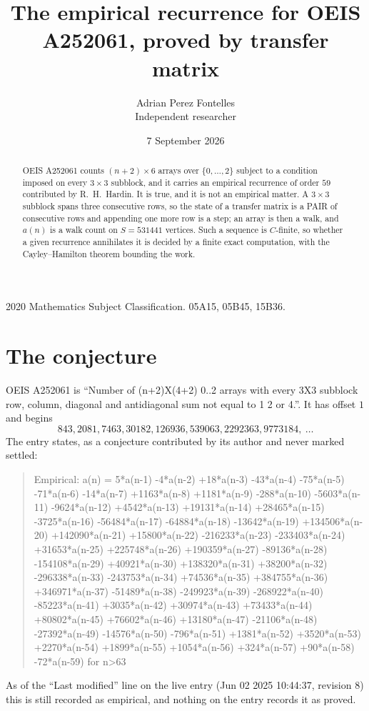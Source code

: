 \documentclass[11pt,a4paper]{article}
\title{The empirical recurrence for OEIS A252061, proved by transfer matrix}
\author{Adrian Perez Fontelles\\ \small Independent researcher}
\date{7 September 2026}
\theoremstyle{plain}
\theoremstyle{definition}
\begin{document}
\maketitle

\begin{abstract}
OEIS A252061 counts $(n+2)\times6$ arrays over $\{0,\dots,2\}$ subject to a condition imposed on
every $3\times3$ subblock, and it carries an empirical recurrence of order $59$
contributed by R.~H.~Hardin. It is true, and it is not an empirical matter. A $3\times3$
subblock spans three consecutive rows, so the state of a transfer matrix is a PAIR of
consecutive rows and appending one more row is a step; an array is then a walk, and
$a(n)$ is a walk count on $S=531441$ vertices. Such a sequence is $C$-finite, so whether a given
recurrence annihilates it is decided by a finite exact computation, with the Cayley--Hamilton
theorem bounding the work.
\end{abstract}

\noindent\small 2020 Mathematics Subject Classification. 05A15, 05B45, 15B36.\normalsize

\section{The conjecture}

OEIS A252061 is ``Number of (n+2)X(4+2) 0..2 arrays with every 3X3 subblock row, column, diagonal and antidiagonal sum not equal to 1 2 or 4.''. It has offset $1$ and begins
\[
843, 2081, 7463, 30182, 126936, 539063, 2292363, 9773184,\ \dots
\]
The entry states, as a conjecture contributed by its author and never marked settled:
\begin{quote}
Empirical: a(n) = 5*a(n-1) -4*a(n-2) +18*a(n-3) -43*a(n-4) -75*a(n-5) -71*a(n-6) -14*a(n-7) +1163*a(n-8) +1181*a(n-9) -288*a(n-10) -5603*a(n-11) -9624*a(n-12) +4542*a(n-13) +19131*a(n-14) +28465*a(n-15) -3725*a(n-16) -56484*a(n-17) -64884*a(n-18) -13642*a(n-19) +134506*a(n-20) +142090*a(n-21) +15800*a(n-22) -216233*a(n-23) -233403*a(n-24) +31653*a(n-25) +225748*a(n-26) +190359*a(n-27) -89136*a(n-28) -154108*a(n-29) +40921*a(n-30) +138320*a(n-31) +38200*a(n-32) -296338*a(n-33) -243753*a(n-34) +74536*a(n-35) +384755*a(n-36) +346971*a(n-37) -51489*a(n-38) -249923*a(n-39) -268922*a(n-40) -85223*a(n-41) +3035*a(n-42) +30974*a(n-43) +73433*a(n-44) +80802*a(n-45) +76602*a(n-46) +13180*a(n-47) -21106*a(n-48) -27392*a(n-49) -14576*a(n-50) -796*a(n-51) +1381*a(n-52) +3520*a(n-53) +2270*a(n-54) +1899*a(n-55) +1054*a(n-56) +324*a(n-57) +90*a(n-58) -72*a(n-59) for n>63
\end{quote}
As of the ``Last modified'' line on the live entry (Jun 02 2025 10:44:37, revision 8) this is still
recorded as empirical, and nothing on the entry records it as proved.
\end{document}
